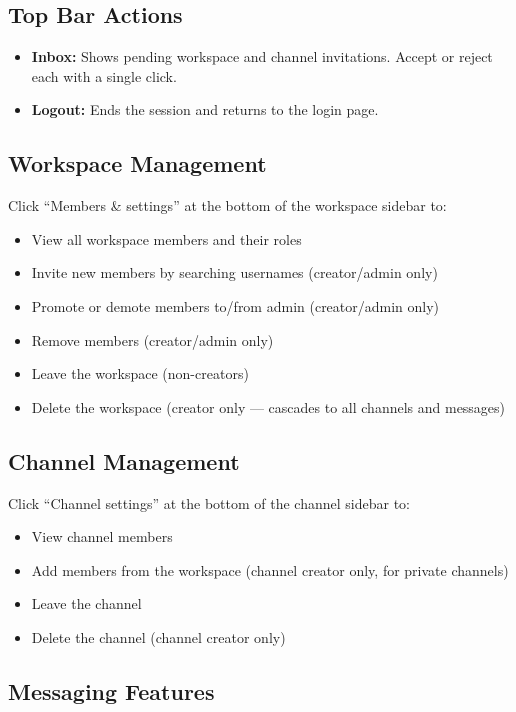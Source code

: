 \documentclass[11pt]{article}
\begin{document}
\subsection{Top Bar Actions}

\begin{itemize}
    \item \textbf{Inbox:} Shows pending workspace and channel invitations. Accept or reject each with a single click.
    \item \textbf{Logout:} Ends the session and returns to the login page.
\end{itemize}

\subsection{Workspace Management}

Click ``Members \& settings'' at the bottom of the workspace sidebar to:
\begin{itemize}
    \item View all workspace members and their roles
    \item Invite new members by searching usernames (creator/admin only)
    \item Promote or demote members to/from admin (creator/admin only)
    \item Remove members (creator/admin only)
    \item Leave the workspace (non-creators)
    \item Delete the workspace (creator only --- cascades to all channels and messages)
\end{itemize}

\subsection{Channel Management}

Click ``Channel settings'' at the bottom of the channel sidebar to:
\begin{itemize}
    \item View channel members
    \item Add members from the workspace (channel creator only, for private channels)
    \item Leave the channel
    \item Delete the channel (channel creator only)
\end{itemize}

\subsection{Messaging Features}
\end{document}
